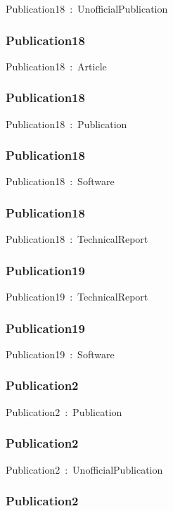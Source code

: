 \documentclass{article}
\begin{document}
Publication18~:~UnofficialPublication

\subsubsection*{Publication18}

Publication18~:~Article

\subsubsection*{Publication18}

Publication18~:~Publication

\subsubsection*{Publication18}

Publication18~:~Software

\subsubsection*{Publication18}

Publication18~:~TechnicalReport

\subsubsection*{Publication19}

Publication19~:~TechnicalReport

\subsubsection*{Publication19}

Publication19~:~Software

\subsubsection*{Publication2}

Publication2~:~Publication

\subsubsection*{Publication2}

Publication2~:~UnofficialPublication

\subsubsection*{Publication2}
\end{document}
